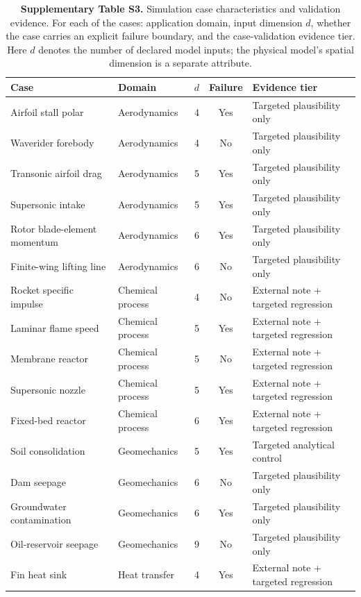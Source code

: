 \begin{table}[htbp]
\centering
\caption{\textbf{Supplementary Table S3.} Simulation case characteristics and validation evidence. For each of the \NumNCases{} cases: application domain, input dimension $d$, whether the case carries an explicit failure boundary, and the case-validation evidence tier. Here $d$ denotes the number of declared model inputs; the physical model's spatial dimension is a separate attribute.}
\label{tab:si_cases}
\SITableFont
\setlength{\tabcolsep}{5pt}
\begin{tabular}{@{}llccl@{}}
\toprule
\textbf{Case} & \textbf{Domain} & $d$ & \textbf{Failure} & \textbf{Evidence tier} \\
\midrule
Airfoil stall polar & Aerodynamics & 4 & Yes & Targeted plausibility only \\
Waverider forebody & Aerodynamics & 4 & No & Targeted plausibility only \\
Transonic airfoil drag & Aerodynamics & 5 & Yes & Targeted plausibility only \\
Supersonic intake & Aerodynamics & 5 & Yes & Targeted plausibility only \\
Rotor blade-element momentum & Aerodynamics & 6 & Yes & Targeted plausibility only \\
Finite-wing lifting line & Aerodynamics & 6 & No & Targeted plausibility only \\
Rocket specific impulse & Chemical process & 4 & No & External note + targeted regression \\
Laminar flame speed & Chemical process & 5 & Yes & External note + targeted regression \\
Membrane reactor & Chemical process & 5 & No & External note + targeted regression \\
Supersonic nozzle & Chemical process & 5 & Yes & External note + targeted regression \\
Fixed-bed reactor & Chemical process & 6 & Yes & External note + targeted regression \\
Soil consolidation & Geomechanics & 5 & Yes & Targeted analytical control \\
Dam seepage & Geomechanics & 6 & No & Targeted plausibility only \\
Groundwater contamination & Geomechanics & 6 & Yes & Targeted plausibility only \\
Oil-reservoir seepage & Geomechanics & 9 & No & Targeted plausibility only \\
Fin heat sink & Heat transfer & 4 & Yes & External note + targeted regression \\

\end{tabular}
\end{table}
